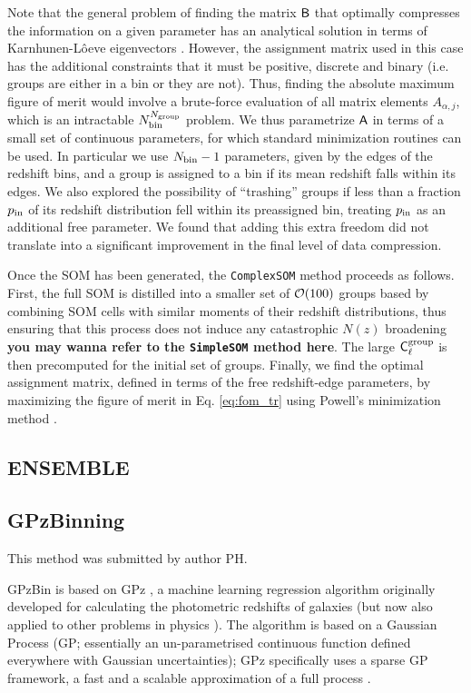 \documentclass[twocolumn,twocolappendix]{aastex63}
\begin{document}
Note that the general problem of finding the matrix ${\sf B}$ that optimally
compresses the information on a given parameter has an analytical solution in
terms of Karnhunen-L\^oeve eigenvectors \citep{astro-ph/9603021}. However, the
assignment matrix used in this case has the additional constraints that it
must be positive, discrete and binary (i.e. groups are either in a bin or they
are not). Thus, finding the absolute maximum figure of merit would involve a
brute-force evaluation of all matrix elements $A_{\alpha,j}$, which is an
intractable $N_{\rm bin}^{N_{\rm group}}$ problem. We thus parametrize ${\sf
A}$ in terms of a small set of continuous parameters, for which standard
minimization routines can be used. In particular we use $N_{\rm bin}-1$
parameters, given by the edges of the redshift bins, and a group is assigned
to a bin if its mean redshift falls within its edges. We also explored the
possibility of ``trashing'' groups if less than a fraction $p_{\rm in}$ of its
redshift distribution fell within its preassigned bin, treating $p_{\rm in}$
as an additional free parameter. We found that adding this extra freedom did
not translate into a significant improvement in the final level of data
compression.

Once the SOM has been generated, the {\tt ComplexSOM} method proceeds as
follows. First, the full SOM is distilled into a smaller set of ${\cal O}(100)$
groups based by combining SOM cells with similar moments of their redshift
distributions, thus ensuring that this process does not induce any catastrophic
$N(z)$ broadening {\bf you may wanna refer to the {\tt SimpleSOM} method here}.
The large ${\sf C}^{\rm group}_\ell$ is then precomputed for the initial set of
groups. Finally, we find the optimal assignment matrix, defined in terms of the
free redshift-edge parameters, by maximizing the figure of merit in Eq.
\ref{eq:fom_tr} using Powell's minimization method
\citep{10.1093/comjnl/7.2.155}.


\subsection{ {\sc ENSEMBLE} }


\subsection{ {\sc GPzBinning} }
This method was submitted by author PH.

GPzBin is based on GPz \citep{Almosallam2016a,Almosallam2016b}, a machine learning
regression algorithm originally developed for calculating the photometric
redshifts of galaxies \citep{Gomes2017,Duncan2018,Hatfield2020} (but now also
applied to other problems in physics \citep{Peng2019,Hatfield2020}). The
algorithm is based on a Gaussian Process (GP; essentially an un-parametrised continuous
function defined everywhere with Gaussian uncertainties); GPz specifically uses 
a sparse GP framework, a fast and a scalable approximation
of a full process \citep{Rasmussen2006}.
\end{document}

